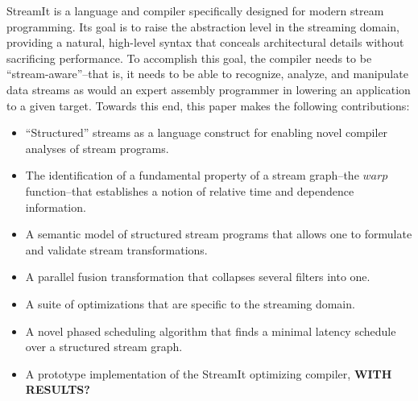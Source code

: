 StreamIt is a language and compiler specifically designed for modern
stream programming.  Its goal is to raise the abstraction level in the
streaming domain, providing a natural, high-level syntax that conceals
architectural details without sacrificing performance.  To accomplish
this goal, the compiler needs to be ``stream-aware''--that is, it
needs to be able to recognize, analyze, and manipulate data streams as
would an expert assembly programmer in lowering an application to a
given target.  Towards this end, this paper makes the following
contributions:
\begin{itemize}

\item ``Structured'' streams as a language construct for enabling
  novel compiler analyses of stream programs.
  
\item The identification of a fundamental property of a stream
  graph--the $warp$ function--that establishes a notion of relative
  time and dependence information.

\item A semantic model of structured stream programs that allows one
  to formulate and validate stream transformations.

\item A parallel fusion transformation that collapses several filters
  into one.

\item A suite of optimizations that are specific to the streaming
  domain.

\item A novel phased scheduling algorithm that finds a minimal latency
schedule over a structured stream graph.

\item A prototype implementation of the StreamIt optimizing compiler,
  {\bf WITH RESULTS?}

\end{itemize}


